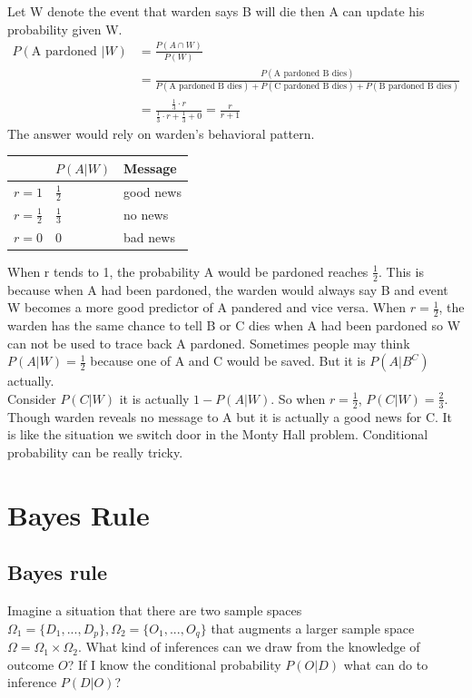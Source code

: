 \documentclass[11pt]{report}
\begin{document}
\begin{solve}
Let W denote the event that warden says B will die then A can update his probability given W.
\begin{align*}
P(\text{A pardoned }|W)&=\frac{P(A\cap W)}{P(W)}\\
&=\frac{P(\text{A pardoned B dies})}{P(\text{A pardoned B dies})+P(\text{C pardoned B dies})+P(\text{B pardoned B dies})}\\
&=\frac{\frac{1}{3}\cdot r}{\frac{1}{3}\cdot r+\frac{1}{3}+0}=\frac{r}{r+1}
\end{align*}
The answer would rely on warden's behavioral pattern.
\begin{table}[h]
\centering
\begin{tabular}{l|ll}
\hline
                & $P(A|W)$      & Message   \\ \hline
$r=1$           & $\frac{1}{2}$ & good news \\ 
$r=\frac{1}{2}$ & $\frac{1}{3}$ & no news   \\ 
$r=0$           & $0$           & bad news  \\ 
\end{tabular}
\end{table}
\begin{intuition}
When r tends to 1, the probability A would be pardoned reaches $\frac{1}{2}$. This is because when A had been pardoned, the warden would always say B and event W becomes a more good predictor of A pandered and vice versa. When $r=\frac{1}{2}$, the warden has the same chance to tell B or C dies when A had been pardoned so W can not be used to trace back A pardoned. Sometimes people may think $P(A|W)=\frac{1}{2}$ because one of A and C would be saved. But it is $P(A|B^C)$ actually. \\
Consider $P(C|W)$ it is actually $1-P(A|W)$. So when $r=\frac{1}{2}$, $P(C|W)=\frac{2}{3}$. Though warden reveals no message to A but it is actually a good news for C. It is like the situation we switch door in the Monty Hall problem. Conditional probability can be really tricky.
\end{intuition}
\end{solve}


\section{Bayes Rule}
\subsection{Bayes rule}
Imagine a situation that there are two sample spaces $\Omega_1 = \{D_1,...,D_p\},\Omega_2 = \{O_1,...,O_q\}$ that augments a larger sample space $\Omega=\Omega_1\times\Omega_2$. What kind of inferences can we draw from the knowledge of outcome $O$? If I know the conditional probability $P(O|D)$ what can do to inference $P(D|O)$?
\end{document}
